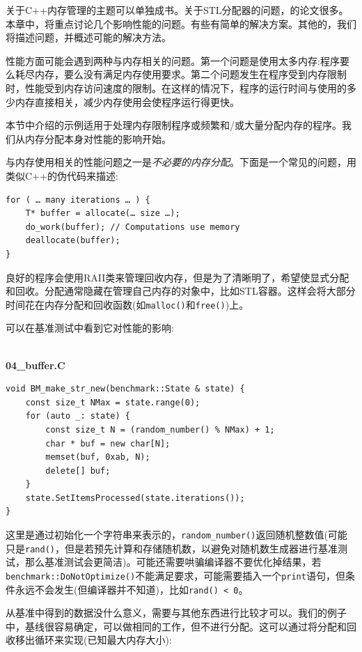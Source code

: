 
关于C++内存管理的主题可以单独成书。关于STL分配器的问题，的论文很多。本章中，将重点讨论几个影响性能的问题。有些有简单的解决方案。其他的，我们将描述问题，并概述可能的解决方法。 

性能方面可能会遇到两种与内存相关的问题。第一个问题是使用太多内存:程序要么耗尽内存，要么没有满足内存使用要求。第二个问题发生在程序受到内存限制时，性能受到内存访问速度的限制。在这样的情况下，程序的运行时间与使用的多少内存直接相关，减少内存使用会使程序运行得更快。 

本节中介绍的示例适用于处理内存限制程序或频繁和/或大量分配内存的程序。我们从内存分配本身对性能的影响开始。


与内存使用相关的性能问题之一是\textit{不必要的内存分配}。下面是一个常见的问题，用类似C++的伪代码来描述:

\begin{lstlisting}[style=styleCXX]
for ( … many iterations … ) {
	T* buffer = allocate(… size …);
	do_work(buffer); // Computations use memory
	deallocate(buffer);
}
\end{lstlisting}

良好的程序会使用RAII类来管理回收内存，但是为了清晰明了，希望使显式分配和回收。分配通常隐藏在管理自己内存的对象中，比如STL容器。这样会将大部分时间花在内存分配和回收函数(如\texttt{malloc()}和\texttt{free()})上。 

可以在基准测试中看到它对性能的影响:

\hspace*{\fill} \\ %
\noindent
\textbf{04\_buffer.C}
\begin{lstlisting}[style=styleCXX]
void BM_make_str_new(benchmark::State & state) {
	const size_t NMax = state.range(0);
	for (auto _: state) {
		const size_t N = (random_number() % NMax) + 1;
		char * buf = new char[N];
		memset(buf, 0xab, N);
		delete[] buf;
	}
	state.SetItemsProcessed(state.iterations());
}
\end{lstlisting}

这里是通过初始化一个字符串来表示的，\texttt{random\_number()}返回随机整数值(可能只是\texttt{rand()}，但是若预先计算和存储随机数，以避免对随机数生成器进行基准测试，那么基准测试会更简洁)。可能还需要哄骗编译器不要优化掉结果，若\texttt{benchmark::DoNotOptimize()}不能满足要求，可能需要插入一个\texttt{print}语句，但条件永远不会发生(但编译器并不知道)，比如\texttt{rand() < 0}。

从基准中得到的数据没什么意义，需要与其他东西进行比较才可以。我们的例子中，基线很容易确定，可以做相同的工作，但不进行分配。这可以通过将分配和回收移出循环来实现(已知最大内存大小):

